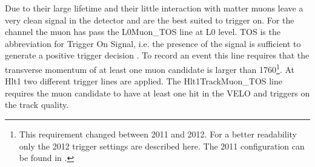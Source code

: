 Due to their large lifetime and their little interaction with matter muons leave a very clean signal in the detector and are the best suited to trigger on. For the \LbToDpmunuX channel the muon has pass the L0Muon\_TOS line at L0 level. TOS is the abbreviation for Trigger On Signal, i.e. the presence of the signal is sufficient to generate a positive trigger decision \cite{Tolk:1701134}. 
To record an event this line requires that the transverse momentum of at least one muon candidate is larger than 1760\mev\footnote{This requirement changed between 2011 and 2012. For a better readability only the 2012 trigger settings are described here. The 2011 configuration can be found in \cite{Trigger_2011_2012}.}.
At Hlt1 two different trigger lines are applied. The Hlt1TrackMuon_TOS line requires the muon candidate to have at least one hit in the VELO and triggers on the track quality.
